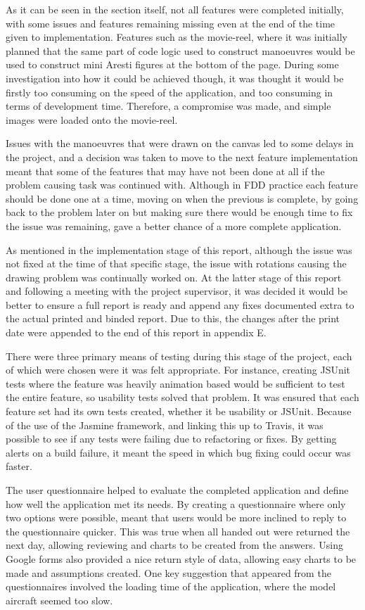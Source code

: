As it can be seen in the section itself, not all features were completed initially, with some issues and features remaining missing even at the end of the time given to implementation. Features such as the movie-reel, where it was initially planned that the same part of code logic used to construct manoeuvres would be used to construct mini Aresti figures at the bottom of the page. During some investigation into how it could be achieved though, it was thought it would be firstly too consuming on the speed of the application, and too consuming in terms of development time. Therefore, a compromise was made, and simple images were loaded onto the movie-reel.

Issues with the manoeuvres that were drawn on the canvas led to some delays in the project, and a decision was taken to move to the next feature implementation meant that some of the features that may have not been done at all if the problem causing task was continued with. Although in FDD practice each feature should be done one at a time, moving on when the previous is complete, by going back to the problem later on but making sure there would be enough time to fix the issue was remaining, gave a better chance of a more complete application.

As mentioned in the implementation stage of this report, although the issue was not fixed at the time of that specific stage, the issue with rotations causing the drawing problem was continually worked on. At the latter stage of this report and following a meeting with the project supervisor, it was decided it would be better to ensure a full report is ready and append any fixes documented extra to the actual printed and binded report. Due to this, the changes after the print date were appended to the end of this report in appendix E. 

There were three primary means of testing during this stage of the project, each of which were chosen were it was felt appropriate. For instance, creating JSUnit tests where the feature was heavily animation based would be sufficient to test the entire feature, so usability tests solved that problem. It was ensured that each feature set had its own tests created, whether it be usability or JSUnit. Because of the use of the Jasmine framework, and linking this up to Travis, it was possible to see if any tests were failing due to refactoring or fixes. By getting alerts on a build failure, it meant the speed in which bug fixing could occur was faster.

The user questionnaire helped to evaluate the completed application and define how well the application met its needs. By creating a questionnaire where only two options were possible, meant that users would be more inclined to reply to the questionnaire quicker. This was true when all handed out were returned the next day, allowing reviewing and charts to be created from the answers. Using Google forms also provided a nice return style of data, allowing easy charts to be made and assumptions created. One key suggestion that appeared from the questionnaires involved the loading time of the application, where the model aircraft seemed too slow.

